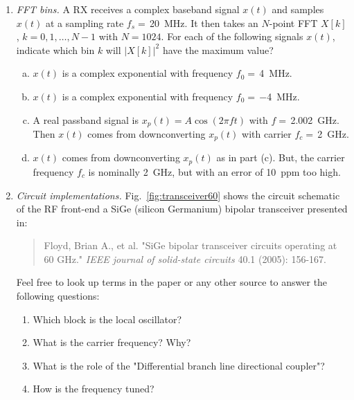 \documentclass[11pt]{article}
\begin{document}
\begin{enumerate}
\item \emph{FFT bins.}  A RX receives a complex baseband signal $x(t)$ and samples
$x(t)$ at a sampling rate $f_s=$\,\SI{20}{MHz}.  It then takes an $N$-point FFT
$X[k]$, $k=0,1,\ldots,N-1$ with $N=1024$.  For each of the following signals $x(t)$, indicate
which bin $k$ will   $|X[k]|^2$ have the maximum value?
\begin{enumerate}[(a)]
  \item $x(t)$ is a complex exponential with frequency $f_0=$\,\SI{4}{MHz}.
  \item $x(t)$ is a complex exponential with frequency $f_0=$\,\SI{-4}{MHz}.
  \item A real passband signal is $x_p(t) = A\cos(2\pi ft)$ with $f=$\,\SI{2.002}{GHz}.
  Then $x(t)$ comes from downconverting $x_p(t)$ with carrier $f_c=$\,\SI{2}{GHz}.
  \item $x(t)$ comes from downconverting $x_p(t)$ as in part (c).  But, the
  carrier frequency $f_c$ is nominally \SI{2}{GHz}, but with an error of \SI{+10}{ppm}
  too high.
\end{enumerate}


\item \emph{Circuit implementations.}  Fig.~\ref{fig:transceiver60} shows the circuit schematic
of the RF front-end a SiGe (silicon Germanium) bipolar transceiver presented in:
\begin{quote}
Floyd, Brian A., et al. "SiGe bipolar transceiver circuits operating at 60 GHz." \emph{IEEE journal of solid-state circuits} 40.1 (2005): 156-167.
\end{quote}
Feel free to look up terms in the paper or any other source to answer the following questions:
\begin{enumerate}
\item Which block is the local oscillator?
\item What is the carrier frequency?  Why?
\item What is the role of the "Differential branch line directional coupler"?
\item How is the frequency tuned?
\end{enumerate}

\end{enumerate}
\end{document}
